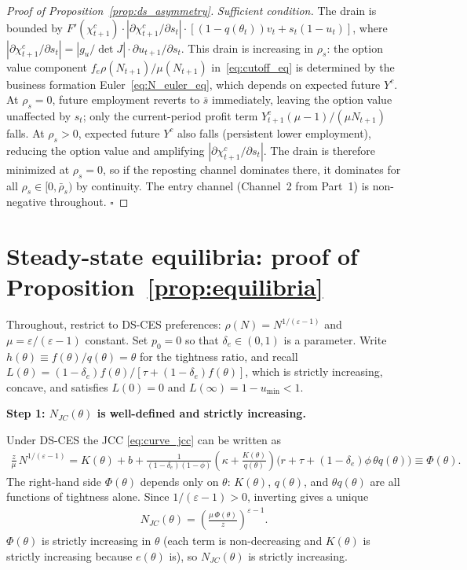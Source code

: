 \documentclass[authoryear, review, 12pt]{elsarticle}
\begin{document}
\begin{proof}[Proof of Proposition~\ref{prop:ds_asymmetry}]
\medskip\noindent\emph{Sufficient condition.}
The drain is bounded by
$F'(\chi^c_{t+1})\cdot|\partial\chi^c_{t+1}/\partial s_t|
\cdot[(1-q(\theta_t))v_t+s_t(1-u_t)]$, where
$|\partial\chi^c_{t+1}/\partial s_t|=|g_u/\det J|
\cdot\partial u_{t+1}/\partial s_t$.
This drain is increasing in $\rho_s$: the option value component
$f_e\rho(N_{t+1})/\mu(N_{t+1})$ in~\eqref{eq:cutoff_eq} is
determined by the business formation Euler~\eqref{eq:N_euler_eq},
which depends on expected future $Y^c$.
At $\rho_s=0$, future employment reverts to $\bar s$ immediately,
leaving the option value unaffected by $s_t$; only the current-period
profit term $Y^c_{t+1}(\mu-1)/(\mu N_{t+1})$ falls.
At $\rho_s>0$, expected future $Y^c$ also falls (persistent lower
employment), reducing the option value and amplifying
$|\partial\chi^c_{t+1}/\partial s_t|$.
The drain is therefore minimized at $\rho_s=0$, so if the reposting
channel dominates there, it dominates for all
$\rho_s\in[0,\bar\rho_s)$ by continuity.
The entry channel (Channel~2 from Part~1) is non-negative throughout.
\hfill$\square$
\end{proof}


	\section{Steady-state equilibria: proof of Proposition~\ref{prop:equilibria}}
	\label{app:equilibria_proof}

Throughout, restrict to DS-CES preferences: $\rho(N)=N^{1/(\varepsilon-1)}$
and $\mu=\varepsilon/(\varepsilon-1)$ constant.  Set $p_0=0$ so that
$\delta_e\in(0,1)$ is a parameter.  Write $h(\theta)\equiv f(\theta)/q(\theta)=\theta$
for the tightness ratio, and recall $L(\theta)=(1-\delta_e)f(\theta)/[\tau+(1-\delta_e)f(\theta)]$,
which is strictly increasing, concave, and satisfies $L(0)=0$ and
$L(\infty)=1-u_{\min}<1$.

\medskip\noindent\textbf{Step 1: $N_{JC}(\theta)$ is well-defined and strictly increasing.}

Under DS-CES the JCC \eqref{eq:curve_jcc} can be written as
\begin{align}\label{eq:jcc_rearranged}
  \frac{z}{\mu}\,N^{1/(\varepsilon-1)}
  = K(\theta) + b
  + \frac{1}{(1-\delta_e)(1-\phi)}
    \left(\kappa+\frac{K(\theta)}{q(\theta)}\right)
    \bigl(r+\tau+(1-\delta_e)\phi\,\theta q(\theta)\bigr)
  \equiv \Phi(\theta).
\end{align}
The right-hand side $\Phi(\theta)$ depends only on $\theta$: $K(\theta)$,
$q(\theta)$, and $\theta q(\theta)$ are all functions of tightness alone.
Since $1/(\varepsilon-1)>0$, inverting gives a unique
\begin{align}
  N_{JC}(\theta)=\left(\frac{\mu\,\Phi(\theta)}{z}\right)^{\varepsilon-1}.
\end{align}
$\Phi(\theta)$ is strictly increasing in $\theta$ (each term is non-decreasing
and $K(\theta)$ is strictly increasing because $e(\theta)$ is), so
$N_{JC}(\theta)$ is strictly increasing.
\end{document}
